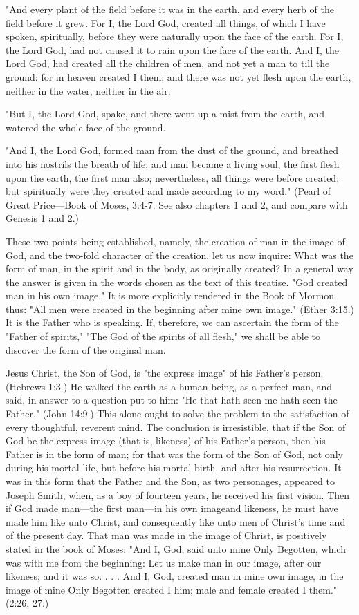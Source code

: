 "And every plant of the field before it was in the earth, and every herb of the field before it
grew. For I, the Lord God, created all things, of which I have spoken, spiritually, before they
were naturally upon the face of the earth. For I, the Lord God, had not caused it to rain upon
the face of the earth. And I, the Lord God, had created all the children of men, and not yet a
man to till the ground: for in heaven created I them; and there was not yet flesh upon the
earth, neither in the water, neither in the air:

"But I, the Lord God, spake, and there went up a mist from the earth, and watered the whole
face of the ground.

"And I, the Lord God, formed man from the dust of the ground, and breathed into his nostrils
the breath of life; and man became a living soul, the first flesh upon the earth, the first man
also; nevertheless, all things were before created; but spiritually were they created and made
according to my word." (Pearl of Great Price—Book of Moses, 3:4-7. See also chapters 1
and 2, and compare with Genesis 1 and 2.)

These two points being established, namely, the creation of man in the image of God, and the
two-fold character of the creation, let us now inquire: What was the form of man, in the spirit
and in the body, as originally created? In a general way the answer is given in the words
chosen as the text of this treatise. "God created man in his own image." It is more explicitly
rendered in the Book of Mormon thus: "All men were created in the beginning after mine
own image." (Ether 3:15.) It is the Father who is speaking. If, therefore, we can ascertain the
form of the "Father of spirits," "The God of the spirits of all flesh," we shall be able to
discover the form of the original man.

Jesus Christ, the Son of God, is "the express image" of his Father's person. (Hebrews 1:3.) He
walked the earth as a human being, as a perfect man, and said, in answer to a question put to
him: "He that hath seen me hath seen the Father." (John 14:9.) This alone ought to solve the
problem to the satisfaction of every thoughtful, reverent mind. The conclusion is irresistible,
that if the Son of God be the express image (that is, likeness) of his Father's person, then his
Father is in the form of man; for that was the form of the Son of God, not only during his
mortal life, but before his mortal birth, and after his resurrection. It was in this form that the
Father and the Son, as two personages, appeared to Joseph Smith, when, as a boy of fourteen
years, he received his first vision. Then if God made man—the first man—in his own imageand likeness, he must have made him like unto Christ, and consequently like unto men of
Christ's time and of the present day. That man was made in the image of Christ, is positively
stated in the book of Moses: "And I, God, said unto mine Only Begotten, which was with me
from the beginning: Let us make man in our image, after our likeness; and it was so. . . . And
I, God, created man in mine own image, in the image of mine Only Begotten created I him;
male and female created I them." (2:26, 27.)

